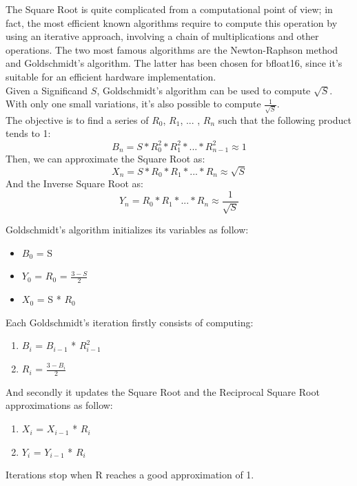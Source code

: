 The Square Root is quite complicated from a computational point of view; in fact, the most efficient known algorithms require to compute this operation by using an iterative approach, involving a chain of multiplications and other operations. The two most famous algorithms are the Newton-Raphson method and Goldschmidt’s algorithm. The latter has been chosen for bfloat16, since it's suitable for an efficient hardware implementation. 
\\
Given a Significand $S$, Goldschmidt's algorithm can be used to compute $\sqrt{S}$. With only one small variations, it's also possible to compute $\frac{1}{\sqrt{S}}$.\\
The objective is to find a series of $R_0$, $R_1$, ... , $R_n$ such that the following product tends to 1:
$$B_n = S*R_0^{2}*R_1^{2}* ... * R_{n-1}^{2} \approx 1 $$
Then, we can approximate the Square Root as:
$$ X_{n} = S * R_0*R_1* ... * R_n \approx \sqrt{S} $$
And the Inverse Square Root as:
$$ Y_n =   R_0*R_1* ... * R_n \approx  \frac{1}{\sqrt{S}}$$

Goldschmidt's algorithm initializes its variables as follow:

\begin{itemize}
\item $B_0$ = S
\item $Y_0$ = $R_0$ = $\frac{3-S}{2}$
\item $X_0$ = S * $R_0$
\end{itemize}

Each Goldschmidt's iteration firstly consists of computing:

\begin{enumerate}
\item $B_i$ = $B_{i-1}$ * $R_{i-1}^{2}$
\item $R_i$ = $\frac{3-B_i}{2}$
\end{enumerate}

And secondly it updates the Square Root and the Reciprocal Square Root approximations as follow:
\begin{enumerate}
\item $X_i$ = $X_{i-1}$ * $R_i$
\item $Y_i$ = $Y_{i-1}$ * $R_i$
\end{enumerate}

Iterations stop when R reaches a good approximation of 1.\\

